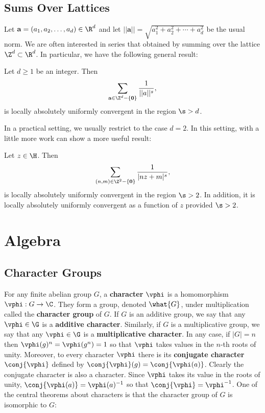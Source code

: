   \section{Sums Over Lattices}
    Let $\mathbf{a} = (a_{1},a_{2},\ldots,a_{d}) \in \R^{d}$ and let $||\mathbf{a}|| = \sqrt{a_{1}^{2}+a_{2}^{2}+\cdots+a_{d}^{2}}$ be the usual norm. We are often interested in series that obtained by summing over the lattice $\Z^{d} \subset \R^{d}$. In particular, we have the following general result:

    \begin{theorem}
      Let $d \ge 1$ be an integer. Then
      \[
        \sum_{\mathbf{a} \in \Z^{d}-\{\mathbf{0}\}}\frac{1}{||a||^{s}},
      \]
      is locally absolutely uniformly convergent in the region $\s > d$.
    \end{theorem}

    In a practical setting, we usually restrict to the case $d = 2$. In this setting, with a little more work can show a more useful result:

    \begin{proposition}\label{prop:general_lattice_sum_convergence_for_two_variables}
      Let $z \in \H$. Then
      \[
        \sum_{(n,m) \in \Z^{2}-\{\mathbf{0}\}}\frac{1}{|nz+m|^{s}},
      \]
      is locally absolutely uniformly convergent in the region $\s > 2$. In addition, it is locally absolutely uniformly convergent as a function of $z$ provided $\s > 2$.
    \end{proposition}
\chapter{Algebra}
  \section{Character Groups}\label{append:Character_Groups}
    For any finite abelian group $G$, a \textbf{character} $\vphi$ is a homomorphism $\vphi:G \to \C$. They form a group, denoted $\what{G}$, under multiplication called the \textbf{character group} of $G$. If $G$ is an additive group, we say that any $\vphi \in \G$ is a \textbf{additive character}. Similarly, if $G$ is a multiplicative group, we say that any $\vphi \in \G$ is a \textbf{multiplicative character}. In any case, if $|G| = n$ then $\vphi(g)^{n} = \vphi(g^{n}) = 1$ so that $\vphi$ takes values in the $n$-th roots of unity. Moreover, to every character $\vphi$ there is its \textbf{conjugate character} $\conj{\vphi}$ defined by $\conj{\vphi}(g) = \conj{\vphi(a)}$. Clearly the conjugate character is also a character. Since $\vphi$ takes its value in the roots of unity, $\conj{\vphi(a)} = \vphi(a)^{-1}$ so that $\conj{\vphi} = \vphi^{-1}$. One of the central theorems about characters is that the character group of $G$ is isomorphic to $G$:

